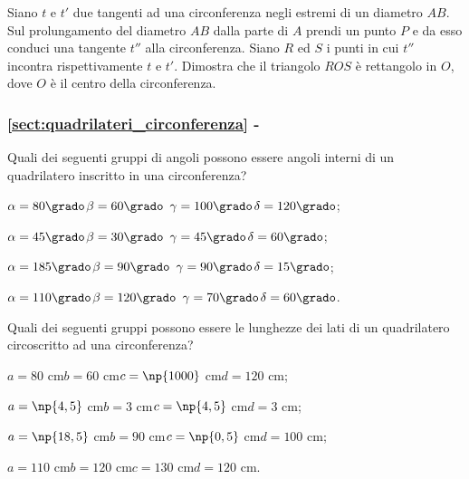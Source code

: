 \begin{multicols}{2}
\begin{esercizio}
\label{ese:5.40}
Siano $t$ e $t'$ due tangenti ad una circonferenza negli estremi di 
un diametro $AB$. Sul prolungamento del diametro $AB$ dalla parte di 
$A$ prendi un punto $P$ e da esso conduci una tangente $t''$ alla 
circonferenza. Siano $R$ ed $S$ i punti in cui $t''$ incontra 
rispettivamente $t$ e $t'$.  Dimostra che il triangolo $ROS$ è 
rettangolo in $O$, dove $O$ è il centro della circonferenza.
\end{esercizio}

\end{multicols}

\begingroup
\hypersetup{linkcolor=black}
\subsubsection*{\ref{sect:quadrilateri_circonferenza} - 
}
\endgroup

\begin{esercizio}
\label{ese:5.41}
Quali dei seguenti gruppi di angoli possono essere angoli interni di 
un quadrilatero inscritto in una circonferenza?
\begin{enumeratea}
\item $\alpha=80\grado$\tab	$\beta=60\grado$\tab 
$\gamma=100\grado$\tab $\delta=120\grado$;
\item $\alpha=45\grado$\tab	$\beta=30\grado$\tab 
$\gamma=45\grado$\tab $\delta=60\grado$;
\item $\alpha=185\grado$\tab $\beta=90\grado$\tab 
$\gamma=90\grado$\tab $\delta=15\grado$;
\item $\alpha=110\grado$\tab $\beta=120\grado$\tab 
$\gamma=70\grado$\tab $\delta=60\grado$.
\end{enumeratea}
\end{esercizio}

\begin{esercizio}
\label{ese:5.42}
Quali dei seguenti gruppi possono essere le lunghezze dei lati di un 
quadrilatero circoscritto ad una circonferenza?
\begin{enumeratea}
\item $a=80$ cm\tab	$b=60$ cm\tab $c=\np{1000}$ cm\tab $d=120$ cm;
\item $a=\np{4,5}$ cm\tab $b=3$ cm\tab $c=\np{4,5}$ cm\tab $d=3$ cm;
\item $a=\np{18,5}$ cm\tab $b=90$ cm\tab $c=\np{0,5}$ cm\tab $d=100$ 
cm;
\item $a=110$ cm\tab $b=120$ cm\tab $c=130$ cm\tab $d=120$ cm.
\end{enumeratea}
\end{esercizio}

